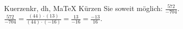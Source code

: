 \begin{MAufgabe}{Kuerzen}{kr, dh, MaTeX}
K\"urzen Sie soweit m\"oglich: $\frac{572}{-704}$.\\ 
\ifLsg\MLoesung
\quad $\frac{572}{-704}=\frac{(44)\cdot(13)}{(44)\cdot(-16)}=\frac{13}{-16}=\frac{-13}{16}$.\else\relax\fi
 \end{MAufgabe}